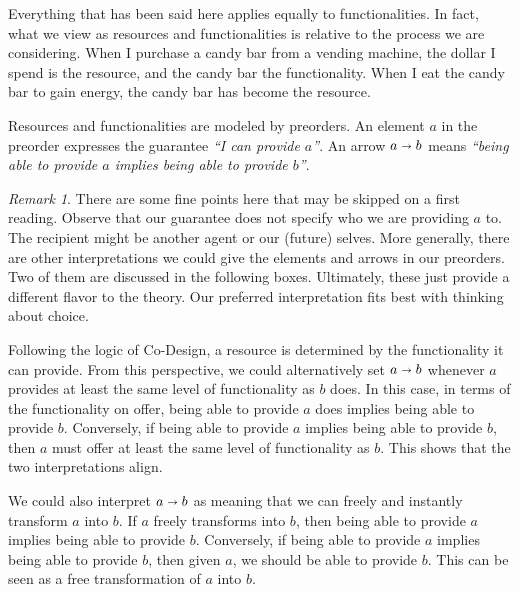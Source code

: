\documentclass[12pt]{article}
\theoremstyle{definition}
\theoremstyle{plain}
\theoremstyle{plain}
\theoremstyle{plain}
\theoremstyle{plain}
\theoremstyle{remark}
\theoremstyle{remark}
\newtheorem{remark}[definition]{Remark}
\begin{document}
Everything that has been said here applies equally to functionalities. In fact, what we view as resources and functionalities is relative to the process we are considering. When I purchase a candy bar from a vending machine, the dollar I spend is the resource, and the candy bar the functionality. When I eat the candy bar to gain energy, the candy bar has become the resource.

\begin{tcolorbox}[title=Resources and Functionalities, colframe=Apricot, colback = paleorange, coltitle = Sepia]
	Resources and functionalities are modeled by preorders. An element $a$ in the preorder expresses the guarantee \emph{``I can provide $a$''}. An arrow $a \shortrightarrow b$ means \emph{``being able to provide $a$ implies being able to provide $b$''}. 
\end{tcolorbox}

\begin{remark}
	There are some fine points here that may be skipped on a first reading. Observe that our guarantee does not specify who we are providing $a$ to. The recipient might be another agent or our (future) selves. More generally, there are other interpretations we could give the elements and arrows in our preorders. Two of them are discussed in the following boxes. Ultimately, these just provide a different flavor to the theory. Our preferred interpretation fits best with thinking about choice.
\end{remark}

\begin{tcolorbox}[title= Functionality Interpretation]
	 Following the logic of Co-Design, a resource is determined by the functionality it can provide. From this perspective, we could alternatively set $a \shortrightarrow b$ whenever $a$ provides at least the same level of functionality as $b$ does. In this case, in terms of the functionality on offer, being able to provide $a$ does implies being able to provide $b$. Conversely, if being able to provide $a$ implies being able to provide $b$, then $a$ must offer at least the same level of functionality as $b$. This shows that the two interpretations align.
\end{tcolorbox}

\begin{tcolorbox}[title= Transformation Interpretation]
	We could also interpret $a \shortrightarrow b$ as meaning that we can freely and instantly transform $a$ into $b$. If $a$ freely transforms into $b$, then being able to provide $a$ implies being able to provide $b$. Conversely, if being able to provide $a$ implies being able to provide $b$, then given $a$, we should be able to provide $b$. This can be seen as a free transformation of $a$ into $b$.
\end{tcolorbox}
\end{document}

